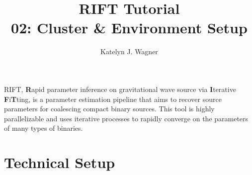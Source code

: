 \documentclass{article}
\title{RIFT Tutorial \\
\large 02: Cluster \& Environment Setup}
\author{Katelyn J. Wagner}
\date{}
\begin{document}
\maketitle


RIFT, \textbf{R}apid parameter inference on gravitational wave source via \textbf{I}terative \textbf{F}i\textbf{T}ting, is a parameter estimation pipeline that aims to recover source parameters for coalescing compact binary sources. This tool is highly parallelizable and uses iterative processes to rapidly converge on the parameters of many types of binaries. 

\section*{Technical Setup}
\end{document}
